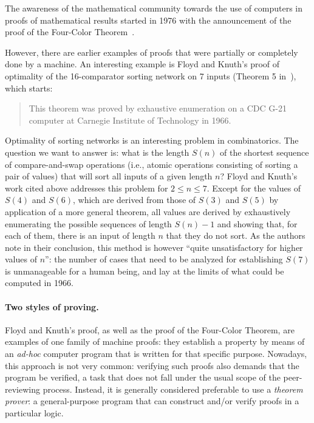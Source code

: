 The awareness of the mathematical community towards the use of computers in
proofs of mathematical results started in 1976 with the announcement of the
proof of the Four-Color Theorem~\cite{AppelHaken1976a}.

However, there are earlier examples of proofs that were partially or completely
done by a machine. An interesting example is Floyd and Knuth's proof of
optimality of the 16-comparator sorting network on 7 inputs (Theorem 5
in~\cite{FloydKnuth1973}), which starts:
\begin{quote}
This theorem was proved by exhaustive enumeration on a CDC G-21 computer at
Carnegie Institute of Technology in 1966.
\end{quote}

Optimality of sorting networks is an interesting problem in combinatorics. The
question we want to answer is: what is the length $S(n)$ of the shortest
sequence of compare-and-swap operations (i.e., atomic operations consisting of
sorting a pair of values) that will sort all inputs of a given length $n$?
Floyd and Knuth's work cited above addresses this problem for $2\leq n\leq 7$.
Except for the values of $S(4)$ and $S(6)$, which are derived from those of
$S(3)$ and $S(5)$ by application of a more general theorem, all values are
derived by exhaustively enumerating the possible sequences of length $S(n)-1$
and showing that, for each of them, there is an input of length $n$ that they do
not sort. As the authors note in their conclusion, this method is however
``quite unsatisfactory for higher values of $n$'': the number of cases that need
to be analyzed for establishing $S(7)$ is unmanageable for a human being, and
lay at the limits of what could be computed in 1966.

\paragraph{Two styles of proving.}

Floyd and Knuth's proof, as well as the proof of the Four-Color Theorem, are
examples of one family of machine proofs: they establish a property by means of
an \emph{ad-hoc} computer program that is written for that specific purpose.
Nowadays, this approach is not very common: verifying such proofs also demands
that the program be verified, a task that does not fall under the usual scope of
the peer-reviewing process. Instead, it is generally considered preferable to
use a \emph{theorem prover}: a general-purpose program that can construct and/or verify proofs in a particular logic.

